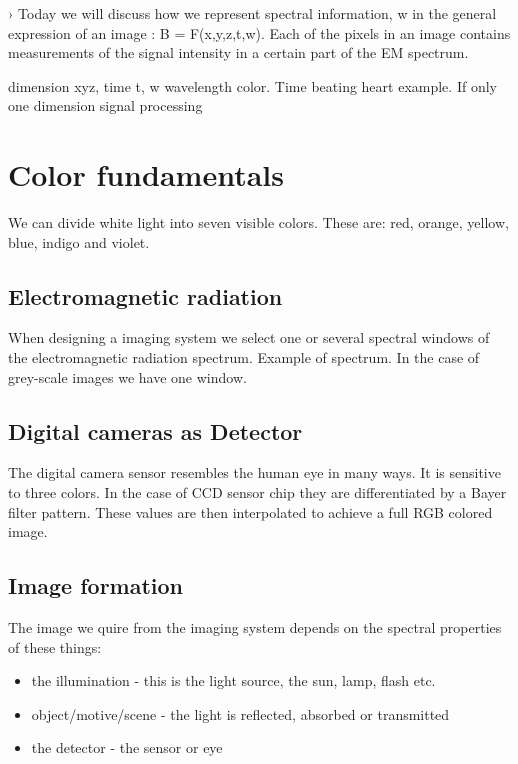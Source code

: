 ›
Today we will discuss how we represent spectral information, w in the general expression of an image : B = F(x,y,z,t,w). Each of the pixels in an image contains measurements of the signal intensity in a certain part of the EM spectrum. 

\begin{wbox}{}
dimension xyz, time t, w wavelength color. Time beating heart example. If only one dimension signal processing
\end{wbox}


\section*{Color fundamentals}
We can divide white light into seven visible colors. These are: red, orange, yellow, blue, indigo and violet. 

\subsection*{Electromagnetic radiation}
When designing a imaging system we select one or several spectral windows of the electromagnetic radiation spectrum. Example of spectrum. In the case of grey-scale images we have one window. 

\subsection*{Digital cameras as Detector}
The digital camera sensor resembles the human eye in many ways. It is sensitive to three colors. In the case of CCD sensor chip they are differentiated by a Bayer filter pattern. These values are then interpolated to achieve a full RGB colored image. 


\subsection*{Image formation}
The image we quire from the imaging system depends on the spectral properties of these things:
\begin{itemize}
	\item the illumination \quad - this is the light source, the sun, lamp, flash etc.
	\item object/motive/scene \quad - the light is reflected, absorbed or transmitted 
	\item the detector \quad - the sensor or eye
\end{itemize}

